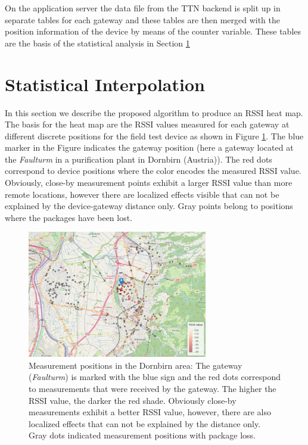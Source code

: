 On the application server the data file from the TTN backend is split up in separate tables for each gateway and these tables are then merged with the position information of the device by means of the counter variable. These tables are the basis of the statistical analysis in Section \ref{sec:kriging}


\section{Statistical Interpolation}\label{sec:kriging}

In this section we describe the proposed algorithm to produce an RSSI heat map. The basis for the heat map are the RSSI values measured for each gateway at different discrete positions for the field test device as shown in Figure \ref{fig:meas}. The blue marker in the Figure indicates the gateway position (here a gateway located at the \emph{Faulturm} in a purification plant in Dornbirn (Austria)). The red dots correspond to device positions where the color encodes the measured RSSI value. Obviously, close-by measurement points exhibit a larger RSSI value than more remote locations, however there are localized effects visible that can not be explained by the device-gateway distance only. Gray points belong to positions where the packages have been lost. 


\begin{figure}[h!]
\centering
\includegraphics[width=0.7\textwidth]{figures/measurements}
\caption{Measurement positions in the Dornbirn area: The gateway (\emph{Faulturm}) is marked with the blue sign and the red dots correspond to measurements that were received by the gateway. The higher the RSSI value, the darker the red shade. Obviously close-by measurements exhibit a better RSSI value, however, there are also localized effects that can not be explained by the distance only. Gray dots indicated measurement positions with package loss.}\label{fig:meas}
\end{figure}

